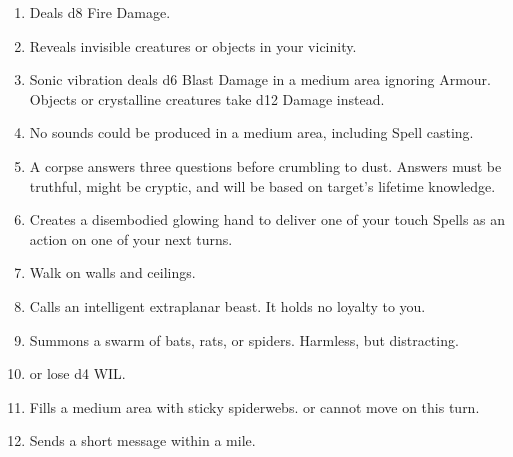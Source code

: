 \documentclass[itdr]{subfiles}
\begin{document}
\begin{enumerate}
	\item {} Deals d8 Fire Damage.
	\item {} Reveals invisible creatures or objects in your vicinity.
	\item {} Sonic vibration deals d6 Blast Damage in a medium area ignoring Armour. Objects or crystalline creatures take d12 Damage instead.
	\item {} No sounds could be produced in a medium area, including Spell casting.
	\item {} A corpse answers three questions before crumbling to dust. Answers must be truthful, might be cryptic, and will be based on target's lifetime knowledge.
	\item {} Creates a disembodied glowing hand to deliver one of your touch Spells as an action on one of your next turns.
	\item {} Walk on walls and ceilings.
	\item {} Calls an intelligent extraplanar beast. It holds no loyalty to you.
	\item {} Summons a swarm of bats, rats, or spiders. Harmless, but distracting.
	\item {}  or lose d4 WIL.
	\item {} Fills a medium area with sticky spiderwebs.  or cannot move on this turn.
	\item {} Sends a short message within a mile.
\end{enumerate}

\vfill
\break
\end{document}
